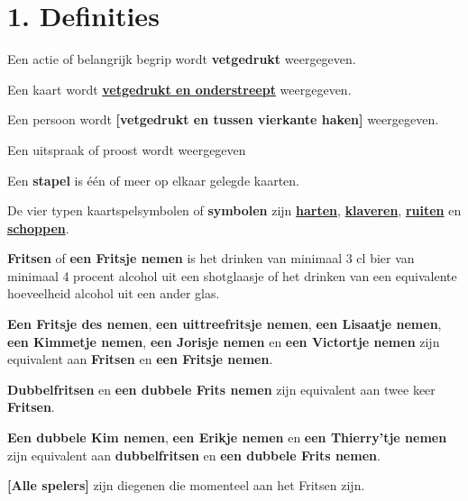 \newpage
\drawBar{}

\section*{1. Definities}

\item Een actie of belangrijk begrip wordt \textbf{vetgedrukt} weergegeven.

\item Een kaart wordt \ul{\textbf{vetgedrukt en onderstreept}} weergegeven.

\item Een persoon wordt \textbf{[vetgedrukt en tussen vierkante haken]} weergegeven.

\item Een uitspraak of proost wordt  weergegeven 

\item Een \textbf{stapel} is één of meer op elkaar gelegde kaarten.

\item De vier typen kaartspelsymbolen of \textbf{symbolen} zijn \ul{\textbf{harten}}, \ul{\textbf{klaveren}}, \ul{\textbf{ruiten}} en \ul{\textbf{schoppen}}. 

\item \label{def:fritsen} \textbf{Fritsen} of \textbf{een Fritsje nemen} is het drinken van minimaal 3 cl bier van minimaal 4 procent alcohol uit een shotglaasje of het drinken van een equivalente hoeveelheid alcohol uit een ander glas.

\item \label{item:enkel_fritsen_equivalent}\textbf{Een Fritsje des nemen}, \textbf{een uittreefritsje nemen}, \textbf{een Lisaatje nemen}, \textbf{een Kimmetje nemen}, \textbf{een Jorisje nemen} en \textbf{een Victortje nemen}  zijn equivalent aan \textbf{Fritsen} en \textbf{een Fritsje nemen}. 

\item \label{item:dubbelfritsen_equivalent} \textbf{Dubbelfritsen} en \textbf{een dubbele Frits nemen} zijn equivalent aan twee keer \textbf{Fritsen}.

\item \textbf{Een dubbele Kim nemen}, \textbf{een Erikje nemen} en \textbf{een Thierry'tje nemen} zijn equivalent aan \textbf{dubbelfritsen} en \textbf{een dubbele Frits nemen}.

\item \textbf{[Alle spelers]} zijn diegenen die momenteel aan het Fritsen zijn.

